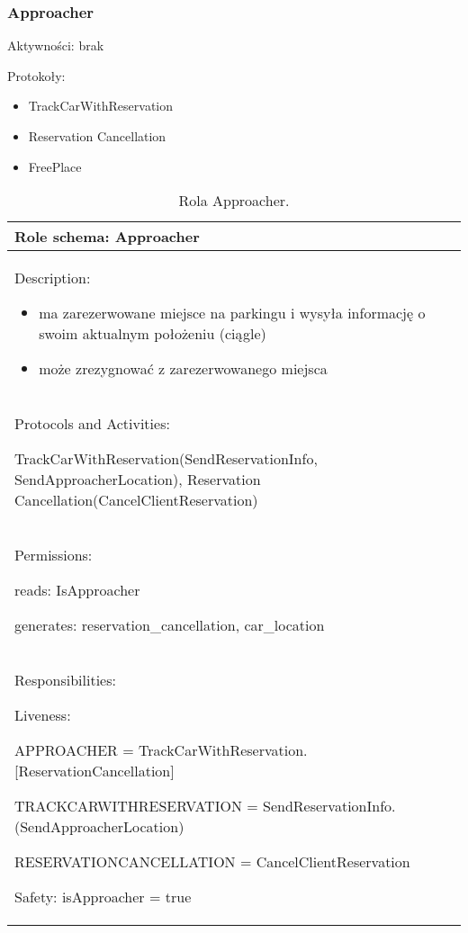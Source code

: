 \subsubsection{Approacher}

Aktywności: brak

Protokoły:
\begin{itemize}
    \item TrackCarWithReservation
    \item Reservation Cancellation
    \item FreePlace
\end{itemize}


\begin{table}[!h] \label{tab:rola1} \centering
    \caption{Rola Approacher.}
    \begin{tabular} {| p{14cm} |} \hline
        Role schema: Approacher \\ \hline
        Description:

        \begin{itemize}
            \item ma zarezerwowane miejsce na parkingu i wysyła informację o swoim aktualnym położeniu (ciągle)
            \item może zrezygnować z zarezerwowanego miejsca
            
        \end{itemize} \\ \hline
        Protocols and Activities: 
        
        TrackCarWithReservation(SendReservationInfo, SendApproacherLocation), Reservation Cancellation(CancelClientReservation) \\ \hline
        Permissions:

        reads: IsApproacher

        generates:  reservation\_cancellation, car\_location \\ \hline
        Responsibilities:

        Liveness: 
        
        APPROACHER = TrackCarWithReservation.[ReservationCancellation]

        TRACKCARWITHRESERVATION = SendReservationInfo.(SendApproacherLocation)

        RESERVATIONCANCELLATION = CancelClientReservation
        

        Safety: isApproacher = true \\ \hline
    \end{tabular}
\end{table}

